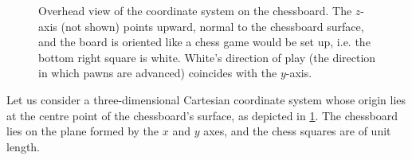 \begin{figure}
    \centering
    \caption[The chessboard coordinate system.]{Overhead view of the coordinate system on the chessboard. The $z$-axis (not shown) points upward, normal to the chessboard surface, and the board is oriented like a chess game would be set up, i.e. the bottom right square is white. White's direction of play (the direction in which pawns are advanced) coincides with the $y$-axis.}
    \label{fig:cartesian_chessboard}
\end{figure}
Let us consider a three-dimensional Cartesian coordinate system whose origin lies at the centre point of the chessboard's surface, as depicted in \cref{fig:cartesian_chessboard}. 
The chessboard lies on the plane formed by the $x$ and $y$ axes, and the chess squares are of unit length. 

